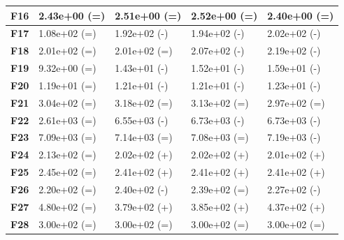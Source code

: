 \documentclass[12pt,a4paper]{report}
\begin{document}
{{{{{{{\begin{table}[h]
\begin{tabular}{|l|l|l|l|l|}
{\bf F16} & 2.43e+00 (=)        & 2.51e+00 (=)    & 2.52e+00 (=)     & 2.40e+00 (=)     \\ \hline
{\bf F17} & 1.08e+02 (=)        & 1.92e+02 (-)    & 1.94e+02 (-)     & 2.02e+02 (-)     \\ \hline
{\bf F18} & 2.01e+02 (=)        & 2.01e+02 (=)    & 2.07e+02 (-)     & 2.19e+02 (-)     \\ \hline
{\bf F19} & 9.32e+00 (=)        & 1.43e+01 (-)    & 1.52e+01 (-)     & 1.59e+01 (-)     \\ \hline
{\bf F20} & 1.19e+01 (=)        & 1.21e+01 (-)    & 1.21e+01 (-)     & 1.23e+01 (-)     \\ \hline
{\bf F21} & 3.04e+02 (=)        & 3.18e+02 (=)    & 3.13e+02 (=)     & 2.97e+02 (=)     \\ \hline
{\bf F22} & 2.61e+03 (=)        & 6.55e+03 (-)    & 6.73e+03 (-)     & 6.73e+03 (-)     \\ \hline
{\bf F23} & 7.09e+03 (=)        & 7.14e+03 (=)    & 7.08e+03 (=)     & 7.19e+03 (-)     \\ \hline
{\bf F24} & 2.13e+02 (=)        & 2.02e+02 (+)    & 2.02e+02 (+)     & 2.01e+02 (+)     \\ \hline
{\bf F25} & 2.45e+02 (=)        & 2.41e+02 (+)    & 2.41e+02 (+)     & 2.41e+02 (+)     \\ \hline
{\bf F26} & 2.20e+02 (=)        & 2.40e+02 (-)    & 2.39e+02 (=)     & 2.27e+02 (-)     \\ \hline
{\bf F27} & 4.80e+02 (=)        & 3.79e+02 (+)    & 3.85e+02 (+)     & 4.37e+02 (+)     \\ \hline
{\bf F28} & 3.00e+02 (=)        & 3.00e+02 (=)    & 3.00e+02 (=)     & 3.00e+02 (=)     \\ \hline
\end{tabular}
\end{table}

}}}}}}}
\end{document}
